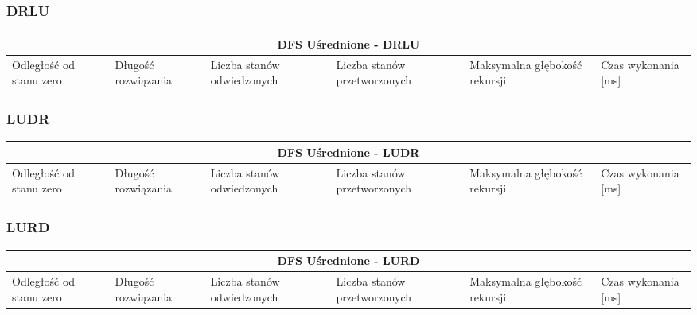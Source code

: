 \documentclass{classrep}
\begin{document}
{\begin{center}
\begin{tabular}{ | p{1.6cm} | p{1.4cm} | p{1.8cm} | p{2cm} | p{2.2cm} | p{2cm} | }
	\hline
	\end{tabular}
\end{center}

\subsubsection{DRLU}
\begin{center}
	\begin{tabular}{ | p{1.6cm} | p{1.4cm} | p{1.8cm} | p{2cm} | p{2.2cm} | p{2cm} | }
	\hline
	\multicolumn{6}{|c|}{DFS Uśrednione - DRLU} \\
	\hline
	Odległość od stanu zero & Długość rozwiązania & Liczba stanów odwiedzonych & Liczba stanów przetworzonych & Maksymalna głębokość rekursji & Czas wykonania [ms]\\
	\hline
	
	\hline
	\end{tabular}
\end{center}

\subsubsection{LUDR}
\begin{center}
	\begin{tabular}{ | p{1.6cm} | p{1.4cm} | p{1.8cm} | p{2cm} | p{2.2cm} | p{2cm} | }
	\hline
	\multicolumn{6}{|c|}{DFS Uśrednione - LUDR} \\
	\hline
	Odległość od stanu zero & Długość rozwiązania & Liczba stanów odwiedzonych & Liczba stanów przetworzonych & Maksymalna głębokość rekursji & Czas wykonania [ms]\\
	\hline
	
	\hline
	\end{tabular}
\end{center}

\subsubsection{LURD}
\begin{center}
	\begin{tabular}{ | p{1.6cm} | p{1.4cm} | p{1.8cm} | p{2cm} | p{2.2cm} | p{2cm} | }
	\hline
	\multicolumn{6}{|c|}{DFS Uśrednione - LURD} \\
	\hline
	Odległość od stanu zero & Długość rozwiązania & Liczba stanów odwiedzonych & Liczba stanów przetworzonych & Maksymalna głębokość rekursji & Czas wykonania [ms]\\
	\hline
	

\end{tabular}
\end{center}}
\end{document}
